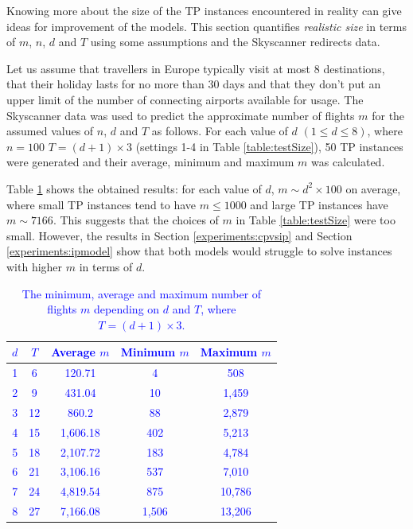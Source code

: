 \documentclass{mpaper}
\begin{document}
Knowing more about the size of the TP instances encountered in reality can give ideas for improvement of the models. This section quantifies \textit{realistic size} in terms of $m$, $n$, $d$ and $T$ using some assumptions and the Skyscanner redirects data.

Let us assume that travellers in Europe typically visit at most 8 destinations, that their holiday lasts for no more than 30 days and that they don't put an upper limit of the number of connecting airports available for usage. The Skyscanner data was used to predict the approximate number of flights $m$ for the assumed values of $n$, $d$ and $T$ as follows. For each value of $d$ $(1 \leq d \leq 8)$, where $n=100$ $T = (d+1) \times 3$ (settings 1-4 in Table \ref{table:testSize}), 50 TP instances were generated and their average, minimum and maximum $m$ was calculated.

Table \ref{table:realisticsize} shows the obtained results: for each value of $d$, $m \sim d^2 \times 100$ on average, where small TP instances tend to have $m \leq 1000$ and large TP instances have $m \sim 7166$. This suggests that the choices of $m$ in Table \ref{table:testSize} were too small. However, the results in Section \ref{experiments:cpvsip} and Section \ref{experiments:ipmodel} show that both models would struggle to solve instances with higher $m$ in terms of $d$.

\vspace{-2mm}
\textcolor{blue}{
\begin{table}[!ht]
\begin{center}
\renewcommand{\arraystretch}{1.2}
\begin{tabular}{|c|c|c|c|c|}
\hline
$d$ & $T$ & Average $m$ & Minimum $m$ & Maximum $m$ \\
\hline
1 & 6  &120.71  	&4       &508 \\
2 & 9  &431.04  	&10      &1,459 \\
3 & 12 &860.2   	&88      &2,879 \\
4 & 15 &1,606.18	&402     &5,213 \\
5 & 18 &2,107.72	&183     &4,784 \\
6 & 21 &3,106.16	&537     &7,010 \\
7 & 24 &4,819.54	&875     &10,786 \\
8 & 27 &7,166.08	&1,506   &13,206 \\
\hline
\end{tabular}
\end{center}
\caption{The minimum, average and maximum number of flights $m$ depending on $d$ and $T$, where $T=(d+1) \times 3$.}
\label{table:realisticsize}
\end{table}}
\vspace{-4mm}
\end{document}
